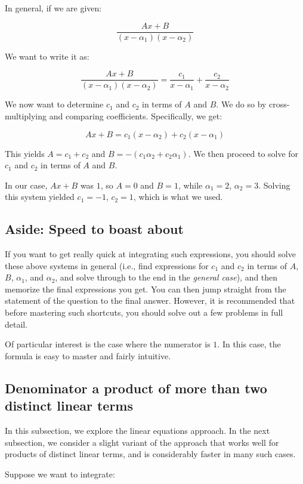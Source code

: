 \documentclass[10pt]{amsart}
\begin{document}
In general, if we are given:

$$\frac{Ax + B}{(x - \alpha_1)(x - \alpha_2)}$$

We want to write it as:

$$\frac{Ax + B}{(x - \alpha_1)(x - \alpha_2)} = \frac{c_1}{x -
\alpha_1} + \frac{c_2}{x - \alpha_2}$$

We now want to determine $c_1$ and $c_2$ in terms of $A$ and $B$. We
do so by cross-multiplying and comparing coefficients. Specifically, we get:

$$Ax + B = c_1(x - \alpha_2) + c_2(x - \alpha_1)$$

This yields $A = c_1 + c_2$ and $B = -(c_1\alpha_2 + c_2\alpha_1)$. We
then proceed to solve for $c_1$ and $c_2$ in terms of $A$ and $B$.

In our case, $Ax + B$ was $1$, so $A = 0$ and $B = 1$, while $\alpha_1
= 2$, $\alpha_2 = 3$. Solving this system yielded $c_1 = -1$, $c_2 =
1$, which is what we used.

\subsection*{Aside: Speed to boast about}

If you want to get really quick at integrating such expressions, you
should solve these above systems in general (i.e., find expressions
for $c_1$ and $c_2$ in terms of $A$, $B$, $\alpha_1$, and $\alpha_2$,
and solve through to the end in the {\em general case}), and then
memorize the final expressions you get. You can then jump straight
from the statement of the question to the final answer. However, it is
recommended that before mastering such shortcuts, you should solve out
a few problems in full detail.

Of particular interest is the case where the numerator is $1$. In this
case, the formula is easy to master and fairly intuitive.

\subsection{Denominator a product of more than two distinct linear terms}

In this subsection, we explore the linear equations approach. In the
next subsection, we consider a slight variant of the approach that
works well for products of distinct linear terms, and is considerably
faster in many such cases.

Suppose we want to integrate:
\end{document}
